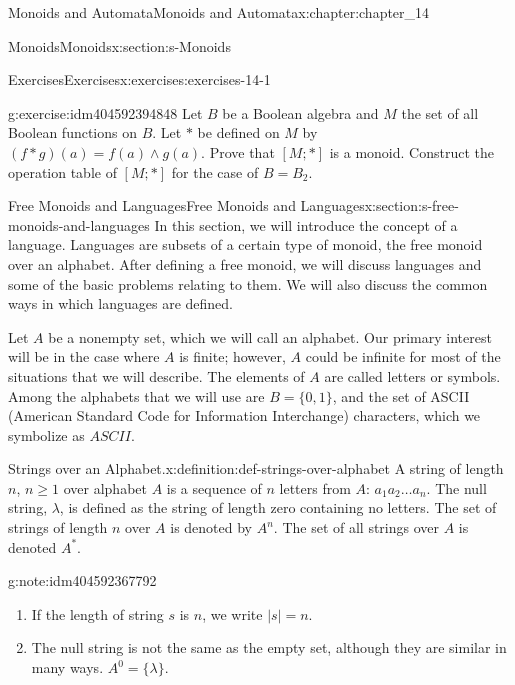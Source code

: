 \documentclass[twoside,10pt,]{book}
\numberwithin{equation}{section}
\begin{document}
\begin{chapterptx}{Monoids and Automata}{}{Monoids and Automata}{}{}{x:chapter:chapter_14}
\begin{sectionptx}{Monoids}{}{Monoids}{}{}{x:section:s-Monoids}
\begin{exercises-subsection}{Exercises}{}{Exercises}{}{}{x:exercises:exercises-14-1}
\begin{divisionexercise}{5}{}{}{g:exercise:idm404592394848}
Let \(B\) be a Boolean algebra and \(M\) the set of all Boolean functions on \(B\). Let \(*\) be defined on \(M\) by \((f * g)(a) = f(a) \land  g(a)\). Prove that \([M;*]\) is a monoid. Construct the operation table of \([M;*]\) for the case of \(B = B_2\).%
\end{divisionexercise}%
\end{exercises-subsection}
\end{sectionptx}
%
%
\typeout{************************************************}
\typeout{************************************************}
%
\begin{sectionptx}{Free Monoids and Languages}{}{Free Monoids and Languages}{}{}{x:section:s-free-monoids-and-languages}
%
In this section, we will introduce the concept of a language. Languages are subsets of a certain type of monoid, the free monoid over an alphabet. After defining a free monoid, we will discuss languages and some of the basic problems relating to them. We will also discuss the common ways in which languages are defined.%
\par
Let \(A\) be a nonempty set, which we will call an alphabet. Our primary interest will be in the case where \(A\) is finite; however, \(A\) could be infinite for most of the situations that we will describe. The elements of \(A\) are called letters or symbols. Among the alphabets that we will use are \(B=\{0,1\}\), and the set of ASCII (American Standard Code for Information Interchange) characters, which we symbolize as \(ASCII\).%
\begin{definition}{Strings over an Alphabet.}{x:definition:def-strings-over-alphabet}%
%
\label{g:notation:idm404592371776}%
\label{g:notation:idm404592370704}%
\label{g:notation:idm404592369312}%
A string of length \(n\), \(n \geqslant 1\) over alphabet \(A\) is a sequence of \(n\) letters from \(A\): \(a_1a_2\ldots a_n\). The null string, \(\lambda\),  is defined as the string of length zero containing no letters. The set of strings of length \(n\) over \(A\) is denoted by \(A^n\). The set of all strings over \(A\) is denoted \(A^*\).%
\end{definition}
\begin{note}{}{g:note:idm404592367792}%
%
\begin{enumerate}[label=(\alph*)]
\item{}If the length of string \(s\) is \(n\), we write \(\lvert s \rvert =n\).%
\item{}The null string is not the same as the empty set, although they are similar in many ways.  \(A^0 = \{\lambda\}\).%

\end{enumerate}
\end{note}
\end{sectionptx}
\end{chapterptx}
\end{document}
